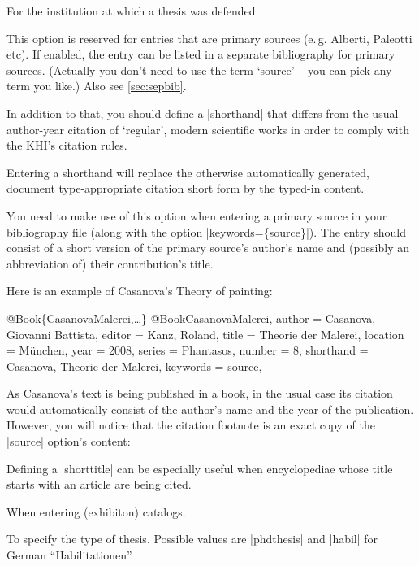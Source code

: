 \documentclass[a4paper,
10pt,
ngerman,
english
]{ltxdoc}
\begin{document}
For the institution at which a thesis was defended.

This option is reserved for entries that are primary sources (e.\,g. Alberti, Paleotti etc). %
If enabled, the entry can be listed in a separate bibliography for primary sources. 
(Actually you don't need to use the term \enquote*{source} -- you can pick any term you like.) 
Also see \cref{sec:sepbib}.

In addition to that, you should define a |shorthand| that differs from the usual author-year citation of \enquote*{regular}, 
modern scientific works in order to comply with the KHI's citation rules.

\label{sec:shorthand}
Entering a shorthand will replace the otherwise automatically generated, document type-appropriate citation short form by the typed-in content.

You need to make use of this option when entering a primary source in your bibliography file (along with the option |keywords=\{source\}|). 
The entry should consist of a short version of the primary source's author's name and (possibly an abbreviation of) their contribution's title.

Here is an example of Casanova's Theory of painting:
\begin{bibexample}[label=CasanovaMalerei]{{@}Book\{CasanovaMalerei,…\}}
@Book{CasanovaMalerei,
  author    = {Casanova, Giovanni Battista},
  editor    = {Kanz, Roland},
  title     = {Theorie der Malerei},
  location  = {München},
  year      = {2008},
  series    = {Phantasos},
  number    = {8},
  shorthand = {Casanova, Theorie der Malerei},
  keywords  = {source},
}
\end{bibexample}
As Casanova's text is being published in a book, in the usual case its citation would automatically consist of the author's name and the year of the publication.
However, you will notice that the citation footnote is an exact copy of the |source| option's content:

Defining a |shorttitle| can be especially useful when encyclopediae whose title starts with an article are being cited.

When entering (exhibiton) catalogs.

To specify the type of thesis. Possible values are |phdthesis| and |habil| for German \foreignquote{ngerman}{Habilitationen}.
\end{document}
